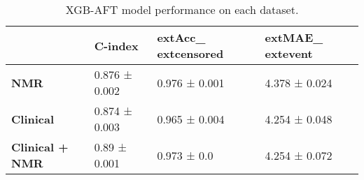 \begin{table}
\caption{XGB-AFT model performance on each dataset.}
\label{tab:results_ex2}
\begin{tabular}{llll}
\toprule
 & C-index & 	ext{Acc}_{	ext{censored}} & 	ext{MAE}_{	ext{event}} \\
\midrule
\textbf{NMR} & 0.876 ± 0.002 & 0.976 ±                 0.001 & 4.378 ± 0.024 \\
\textbf{Clinical} & 0.874 ± 0.003 & 0.965 ±                 0.004 & 4.254 ± 0.048 \\
\textbf{Clinical + NMR} & 0.89 ± 0.001 & 0.973 ±                 0.0 & 4.254 ± 0.072 \\
\bottomrule
\end{tabular}
\end{table}
